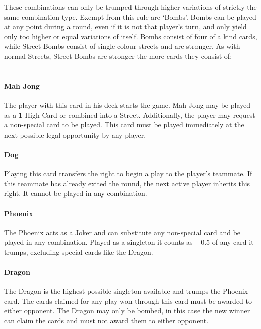 These combinations can only be trumped through higher variations of strictly the same combination-type. Exempt from this rule are ‘Bombs’. Bombs can be played at any point during a round, even if it is not that player’s turn, and only yield only too higher or equal variations of itself. Bombs consist of four of a kind cards, while Street Bombs consist of single-colour streets and are stronger. As with normal Streets, Street Bombs are stronger the more cards they consist of:
\\
\\

\paragraph*{Mah Jong}
The player with this card in his deck starts the game. Mah Jong may be played as a \textbf{1} High Card or combined into a Street. Additionally, the player may request a non-special card to be played. This card must be played immediately at the next possible legal opportunity by any player.
\paragraph*{Dog}
Playing this card transfers the right to begin a play to the player’s teammate. If this teammate has already exited the round, the next active player inherits this right. It cannot be played in any combination.
\paragraph*{Phoenix}
The Phoenix acts as a Joker and can substitute any non-special card and be played in any combination. Played as a singleton it counts as +0.5 of any card it trumps, excluding special cards like the Dragon.
\paragraph{Dragon}
The Dragon is the highest possible singleton available and trumps the Phoenix card. The cards claimed for any play won through this card must be awarded to either opponent. The Dragon may only be bombed, in this case the new winner can claim the cards and must not award them to either opponent.


